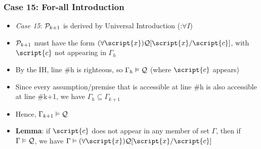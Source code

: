 \begin{frame}
\frametitle{Case 15: For-all Introduction}

\begin{itemize}[<+->]

\item \emph{Case 15}: $\mathcal{P}_{k +1}$ is derived by Universal Introduction (:$\forall I$) %

\item $\mathcal{P}_{k+1}$ must have the form $\qt{\forall}{\script{x}}\metav{Q}\substitute{\script{c}}{\script{x}}$, with $\script{c}$ not appearing in $\Gamma_h$ %


\item By the IH,  line \#h is righteous, so $\Gamma_{h} \vDash \mathcal{Q}$ (where $\script{c}$ appears)

\item Since every assumption/premise that is accessible at line \#h is also accessible at line \#k+1, we have $\Gamma_h \subseteq \Gamma_{k+1}$

\item Hence, $\Gamma_{k+1} \vDash \mathcal{Q}$

\item \textbf{Lemma}: if $\script{c}$ does not appear in any member of set $\Gamma$, then if $\Gamma \vDash \mathcal{Q}$, we have $\Gamma \entails \qt{\forall}{\script{x}}\metav{Q}\substitute{\script{c}}{\script{x}}$




\end{itemize}
\end{frame}
